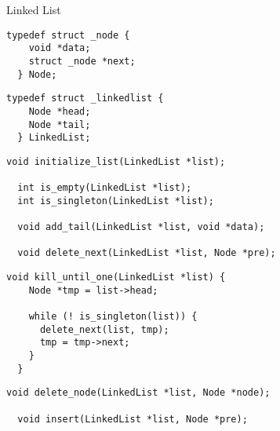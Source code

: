 \begin{frame}{}
  \centerline{\LARGE Linked List}

  \vspace{0.6cm}
  \centerline{\large {}}
\end{frame}

\begin{frame}[fragile]{}
  \begin{lstlisting}[style = Cstyle]
  typedef struct _node {
    void *data;
    struct _node *next;
  } Node;
  \end{lstlisting}

  \begin{lstlisting}[style = Cstyle]
  typedef struct _linkedlist {
    Node *head;
    Node *tail;
  } LinkedList;
  \end{lstlisting}
\end{frame}

\begin{frame}[fragile]{}
  \begin{lstlisting}[style = Cstyle]
  void initialize_list(LinkedList *list);

  int is_empty(LinkedList *list);
  int is_singleton(LinkedList *list);

  void add_tail(LinkedList *list, void *data);

  void delete_next(LinkedList *list, Node *pre);
  \end{lstlisting}
\end{frame}

\begin{frame}[fragile]{}
  \begin{lstlisting}[style = Cstyle]
  void kill_until_one(LinkedList *list) {
    Node *tmp = list->head;

    while (! is_singleton(list)) {
      delete_next(list, tmp);
      tmp = tmp->next;
    }
  }
  \end{lstlisting}

  \vspace{0.60cm}
  \centerline{\large {}}
\end{frame}

\begin{frame}[fragile]{}
  \begin{lstlisting}[style = Cstyle]
  void delete_node(LinkedList *list, Node *node);

  void insert(LinkedList *list, Node *pre);
  \end{lstlisting}
\end{frame}
